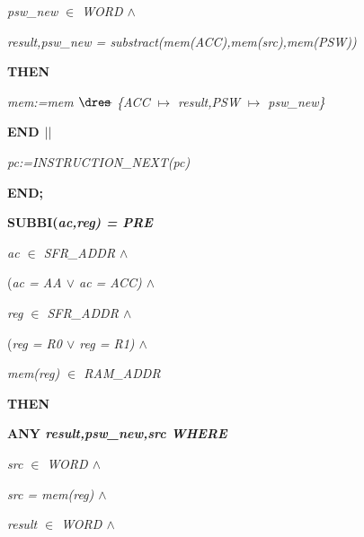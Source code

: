 \begin{sloppypar}
\hspace*{0.30in}\it psw\_new $\in$  \it WORD  $\land$ 

\hspace*{0.30in}\it result\rm ,\it psw\_new \rm = \it substract\rm (\it mem\rm (\it ACC\rm )\rm ,\it mem\rm (\it src\rm )\rm ,\it mem\rm (\it PSW\rm )\rm )

\hspace*{0.20in}\bf THEN

\hspace*{0.30in}\it mem\rm :=\it mem $\lover$ \rm \{\it ACC $\mapsto$ \it result\rm ,\it PSW $\mapsto$ \it psw\_new\rm \}

\hspace*{0.20in}\bf END  $\mbox{$\mid\mid$}$ 

\hspace*{0.20in}\it pc\rm :=\it INSTRUCTION\_NEXT\rm (\it pc\rm )

\hspace*{0.10in}\bf END\rm ;

\hspace*{0.10in}\bf SUBBI\rm (\it ac\rm ,\it reg\rm ) \rm = \bf PRE

\hspace*{0.20in}\it ac $\in$  \it SFR\_ADDR  $\land$ 

\hspace*{0.20in}\rm (\it ac \rm = \it AA  $\lor$  \it ac \rm = \it ACC\rm )  $\land$ 

\hspace*{0.20in}\it reg $\in$  \it SFR\_ADDR  $\land$ 

\hspace*{0.20in}\rm (\it reg \rm = \it R0  $\lor$  \it reg \rm = \it R1\rm )  $\land$ 

\hspace*{0.20in}\it mem\rm (\it reg\rm ) $\in$  \it RAM\_ADDR

\hspace*{0.10in}\bf THEN

\hspace*{0.20in}\bf ANY \it result\rm ,\it psw\_new\rm ,\it src \bf WHERE

\hspace*{0.30in}\it src $\in$  \it WORD  $\land$ 

\hspace*{0.30in}\it src \rm = \it mem\rm (\it reg\rm )  $\land$ 

\hspace*{0.30in}\it result $\in$  \it WORD  $\land$ 


\end{sloppypar}

